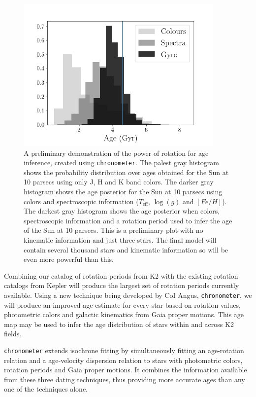 \documentclass[12pt]{article}
\begin{document}
\begin{figure}[!t]
\centering
\includegraphics[width=4in]{all_hist_working.png}
\caption{A preliminary demonstration of the power of rotation for age
    inference, created using {\tt chronometer}.
    The palest gray histogram shows the probability distribution over ages
    obtained for the Sun at 10 parsecs using only J, H and K band colors.
    The darker gray histogram shows the age posterior for the Sun at 10
    parsecs using colors and spectroscopic information ($T_{\mathrm{eff}}$,
    $\log(g)$ and $[Fe/H]$).
    The darkest gray histogram shows the age posterior when colors,
    spectroscopic information and a rotation period used to infer the age of
    the Sun at 10 parsecs.
    This is a preliminary plot with no kinematic information and just three
    stars.
    The final model will contain several thousand stars and kinematic
    information so will be even more powerful than this.
}
\label{fig:chrono}
\end{figure}

Combining our catalog of rotation periods from K2 with the existing rotation
catalogs from Kepler will produce the largest set of rotation periods
currently available.
Using a new technique being developed by CoI Angus, {\tt chronometer}, we
will produce an improved age estimate for every star based on rotation values,
photometric colors and galactic kinematics from Gaia proper motions.
This age map may be used to infer the age distribution of stars within and
across K2 fields.

{\tt chronometer} extends isochrone fitting by simultaneously fitting an
age-rotation relation and a age-velocity dispersion relation to stars with
photometric colors, rotation periods and Gaia proper motions.
It combines the information available from these three dating techniques, thus
providing more accurate ages than any one of the techniques alone.
\end{document}
